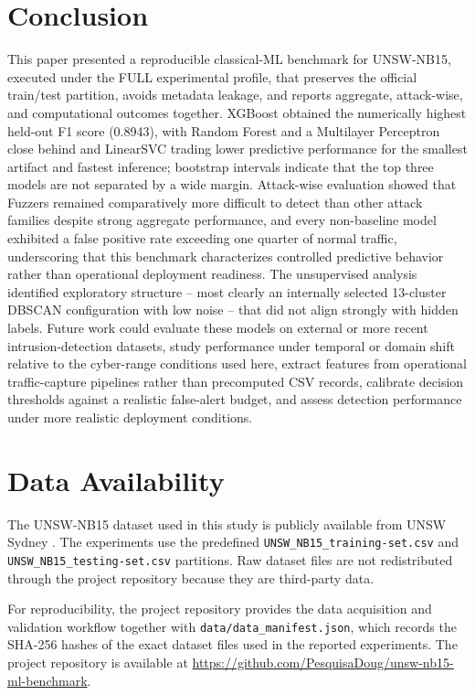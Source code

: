 \documentclass[conference]{IEEEtran}
\begin{document}
\section{Conclusion}
This paper presented a reproducible classical-ML benchmark for UNSW-NB15, executed under the FULL experimental profile, that preserves the official train/test partition, avoids metadata leakage, and reports aggregate, attack-wise, and computational outcomes together. XGBoost obtained the numerically highest held-out F1 score (0.8943), with Random Forest and a Multilayer Perceptron close behind and LinearSVC trading lower predictive performance for the smallest artifact and fastest inference; bootstrap intervals indicate that the top three models are not separated by a wide margin. Attack-wise evaluation showed that Fuzzers remained comparatively more difficult to detect than other attack families despite strong aggregate performance, and every non-baseline model exhibited a false positive rate exceeding one quarter of normal traffic, underscoring that this benchmark characterizes controlled predictive behavior rather than operational deployment readiness. The unsupervised analysis identified exploratory structure -- most clearly an internally selected 13-cluster DBSCAN configuration with low noise -- that did not align strongly with hidden labels. Future work could evaluate these models on external or more recent intrusion-detection datasets, study performance under temporal or domain shift relative to the cyber-range conditions used here, extract features from operational traffic-capture pipelines rather than precomputed CSV records, calibrate decision thresholds against a realistic false-alert budget, and assess detection performance under more realistic deployment conditions.

\section{Data Availability}
The UNSW-NB15 dataset used in this study is publicly available from UNSW Sydney \cite{unswDatasetPage}. The experiments use the predefined \texttt{UNSW\_NB15\_training-set.csv} and \texttt{UNSW\_NB15\_testing-set.csv} partitions. Raw dataset files are not redistributed through the project repository because they are third-party data.

For reproducibility, the project repository provides the data acquisition and validation workflow together with \texttt{data/data\_manifest.json}, which records the SHA-256 hashes of the exact dataset files used in the reported experiments. The project repository is available at \url{https://github.com/PesquisaDoug/unsw-nb15-ml-benchmark}.
\end{document}

